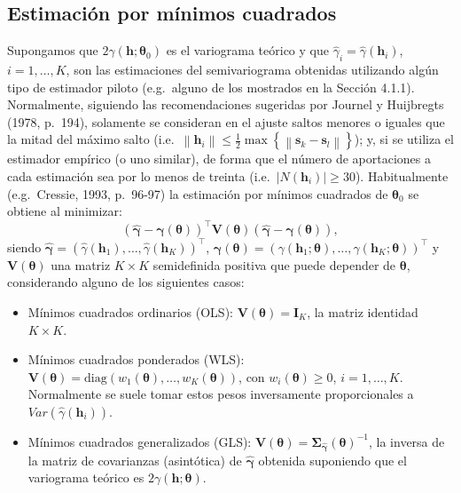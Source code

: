 \documentclass[
]{book}
\theoremstyle{break}
\theoremstyle{definition}
\theoremstyle{definition}
\theoremstyle{definition}
\theoremstyle{definition}
\theoremstyle{remark}
\begin{document}
\subsection{Estimación por mínimos cuadrados}\label{ls-fit}

Supongamos que \(2\gamma(\mathbf{h};\boldsymbol{\theta}_0)\) es el variograma teórico y que \(\hat{\gamma}_{i} =\hat{\gamma}(\mathbf{h}_{i})\), \(i = 1,\ldots,K\), son las estimaciones del semivariograma obtenidas utilizando algún tipo de estimador piloto (e.g.~alguno de los mostrados en la Sección 4.1.1).
Normalmente, siguiendo las recomendaciones sugeridas por Journel y Huijbregts (1978, p.~194), solamente se consideran en el ajuste saltos menores o iguales que la mitad del máximo salto (i.e.~\(\left\| \mathbf{h}_{i} \right\| \leq \frac{1}{2} \max \left\{ \left\| \mathbf{s}_{k} -\mathbf{s}_{l} \right\| \right\}\)); y, si se utiliza el estimador empírico (o uno similar), de forma que el número de aportaciones a cada estimación sea por lo menos de treinta (i.e.~\(\left| N(\mathbf{h}_{i})\right| \geq 30\)).
Habitualmente (e.g.~Cressie, 1993, p.~96-97) la estimación por mínimos cuadrados de \(\boldsymbol{\theta}_0\) se obtiene al minimizar:
\begin{equation} 
  \left( \hat{\boldsymbol{\gamma}} - \boldsymbol{\gamma}(\boldsymbol{\theta})\right)^{\top } \mathbf{V}(\boldsymbol{\theta})\left( \hat{\boldsymbol{\gamma}} - \boldsymbol{\gamma}(\boldsymbol{\theta})\right),
  \label{eq:ls-obj}
\end{equation}
siendo \(\hat{\boldsymbol{\gamma}} =(\hat{\gamma}(\mathbf{h}_1),\ldots,\hat{\gamma}
(\mathbf{h}_{K}))^\top\), \(\boldsymbol{\gamma}(\boldsymbol{\theta})=(\gamma(\mathbf{h}_1 ;\boldsymbol{\theta}),\ldots,\gamma(\mathbf{h}_{K} ;\boldsymbol{\theta}))^\top\)
y \(\mathbf{V}(\boldsymbol{\theta})\) una matriz \(K\times K\) semidefinida positiva que puede
depender de \(\boldsymbol{\theta}\), considerando alguno de los siguientes casos:

\begin{itemize}
\item
  Mínimos cuadrados ordinarios (OLS): \(\mathbf{V}(\boldsymbol{\theta}) = \mathbf{I}_{K}\),
  la matriz identidad \(K\times K\).
\item
  Mínimos cuadrados ponderados (WLS): \(\mathbf{V}(\boldsymbol{\theta}) = \text{diag}(w_1 (\boldsymbol{\theta}),\ldots,w_{K}(\boldsymbol{\theta}))\),
  con \(w_{i}(\boldsymbol{\theta})\geq 0\), \(i=1,\ldots,K\).
  Normalmente se suele tomar estos pesos inversamente proporcionales a \(Var(\hat{\gamma}(\mathbf{h}_{i}))\).
\item
  Mínimos cuadrados generalizados (GLS): \(\mathbf{V}(\boldsymbol{\theta})=\boldsymbol{\Sigma}_{\hat{\boldsymbol{\gamma}}} (\boldsymbol{\theta})^{-1}\),
  la inversa de la matriz de covarianzas (asintótica) de \(\hat{\boldsymbol{\gamma}}\) obtenida suponiendo que el variograma teórico es \(2\gamma(\mathbf{h};\boldsymbol{\theta})\).
\end{itemize}
\end{document}
